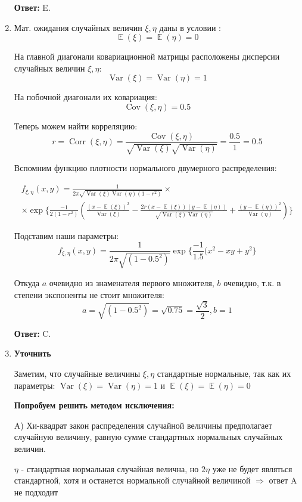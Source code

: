 \documentclass[a4paper]{article} %
\DeclareMathOperator{\Var}{Var}
\DeclareMathOperator{\Cov}{Cov}
\DeclareMathOperator{\Corr}{Corr}
\DeclareMathOperator{\E}{\mathbb{E}}
\begin{document}
\begin{enumerate}
    \textbf{Ответ:} E.
    
    
    \item
    Мат. ожидания случайных величин $\xi, \eta $ даны в условии :
    \[\E(\xi) = \E(\eta) = 0\]
    
    На главной диагонали ковариационной матрицы расположены дисперсии случайных величин $\xi, \eta $: 
    \[\Var(\xi) = \Var(\eta) = 1\]
    
    На побочной диагонали их ковариация: 
    \[\Cov(\xi, \eta) = 0.5\]
    
    Теперь можем найти корреляцию:
    \[r = \Corr(\xi, \eta) = \frac{\Cov(\xi, \eta)}{\sqrt{\Var(\xi)}\sqrt{\Var(\eta)}} = \frac{0.5}{1} = 0.5\]
    
    Вспомним функцию плотности нормального двумерного распределения:
    
    \[ \begin{gathered} f_{\xi, \eta}(x,y) = \frac{1}{2\pi\sqrt{\Var(\xi)\Var(\eta)(1-r^2)}} \times \\ 
    \times \exp{\{\frac{-1}{2(1-r^2)}(\frac{(x-\E(\xi))^2}{\Var(\xi)}-\frac{2r(x-\E(\xi))(y-\E(\eta))}{\sqrt{\Var(\xi)\Var(\eta)}}+\frac{(y-\E(\eta))^2}{\Var(\eta)})\}} \end{gathered}\]
    
    Подставим наши параметры:
    \[f_{\xi, \eta}(x,y) = \frac{1}{2\pi\sqrt{(1-0.5^2)}} \exp{\{\frac{-1}{1.5}(x^2-xy+y^2\}}\]
    
    Откуда $a$ очевидно из знаменателя первого множителя, $b$ очевидно, т.к. в степени экспоненты не стоит множителя:
    \[a = \sqrt{(1-0.5^2)} = \sqrt{0.75} = \frac{\sqrt{3}}{2}, b=1 \] 
    
    \textbf{Ответ:} C.
    
    
    \item
    \textbf{Уточнить}
    
    Заметим, что случайные величины $\xi, \eta $ стандартные нормальные, так как их параметры: $\Var(\xi) = \Var(\eta) = 1$ и $\E(\xi) = \E(\eta) = 0$
    
    \textbf{Попробуем решить методом исключения:}
    
    A) Хи-квадрат закон распределения случайной величины предполагает случайную величину, равную сумме стандартных нормальных случайных величин.
    
    $\eta$ - стандартная нормальная случайная велична, но $2\eta$ уже не будет являться стандартной, хотя и останется нормальной случайной величиной $\Rightarrow$ ответ A не подходит
    

\end{enumerate}
\end{document}
